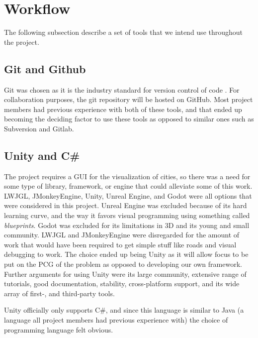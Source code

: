 \section{Workflow}


The following subsection describe a set of tools that we intend use throughout the project.

\subsection{Git and Github}
Git was chosen as it is the industry standard for version control of code \cite{git_industry_standard}.
For collaboration purposes, the git repository will be hosted on GitHub.
Most project members had previous experience with both of these tools, and that ended up becoming the deciding factor to use these tools as opposed to similar ones such as Subversion and Gitlab.

\subsection{Unity and C\#}
The project requires a GUI for the visualization of cities, so there was a need for some type of library, framework, or engine that could alleviate some of this work.
LWJGL, JMonkeyEngine, Unity, Unreal Engine, and Godot were all options that were considered in this project.
Unreal Engine was excluded because of its hard learning curve, and the way it favors visual programming using something called \textit{blueprints}.
Godot was excluded for its limitations in 3D and its young and small community.
LWJGL and JMonkeyEngine were disregarded for the amount of work that would have been required to get simple stuff like roads and visual debugging to work.
The choice ended up being Unity as it will allow focus to be put on the PCG of the problem as opposed to developing our own framework.
Further arguments for using Unity were its large community, extensive range of tutorials, good documentation, stability, cross-platform support, and its wide array of first-, and third-party tools.

Unity officially only supports C\#, and since this language is similar to Java (a language all project members had previous experience with) the choice of programming language felt obvious.